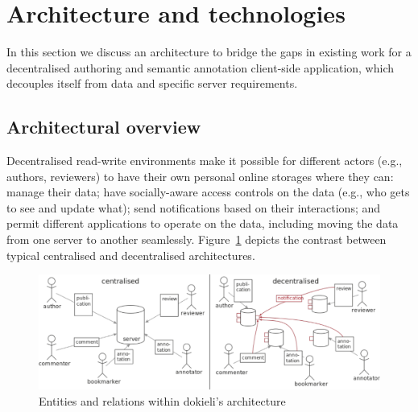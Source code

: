 \documentclass[a4paper]{llncs}
\begin{document}
                    

                    
                        \section{Architecture and technologies}
  \label{architecture-and-technologies}

                        
                            
\par In this section we discuss an architecture to bridge the gaps in existing work for a decentralised authoring and semantic annotation client-side application, which decouples itself from data and specific server requirements.

                            
                                \subsection{Architectural overview}
  \label{architectural-overview}

                                
                                    
\par Decentralised read-write environments make it possible for different actors (e.g., authors, reviewers) to have their own personal online storages where they can: manage their data; have socially-aware access controls on the data (e.g., who gets to see and update what); send notifications based on their interactions; and permit different applications to operate on the data, including moving the data from one server to another seamlessly. Figure~\ref{fig:centralised-decentralised-architectures} depicts the contrast between typical centralised and decentralised architectures.

\begin{figure}
  \centering
  \includegraphics[width=\textwidth]{media/images/centralised-decentralised-architectures}
  \caption{Entities and relations within dokieli’s architecture}
  \label{fig:centralised-decentralised-architectures}
\end{figure}
\end{document}
